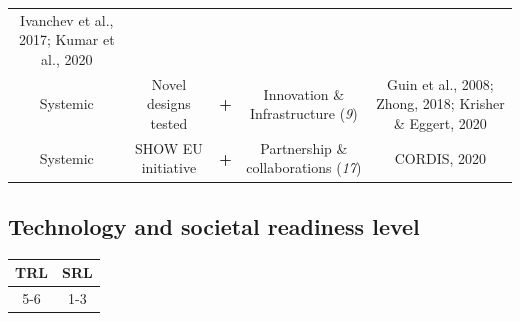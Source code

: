 \documentclass[
]{book}
\begin{document}
\begin{longtable}[]{@{}ccccc@{}}
\begin{minipage}[t]{0.17\columnwidth}
Ivanchev et al., 2017; Kumar et al., 2020\strut
\end{minipage}\tabularnewline
\begin{minipage}[t]{0.17\columnwidth}\centering
Systemic\strut
\end{minipage} & \begin{minipage}[t]{0.16\columnwidth}\centering
Novel designs tested\strut
\end{minipage} & \begin{minipage}[t]{0.17\columnwidth}\centering
\textbf{+}\strut
\end{minipage} & \begin{minipage}[t]{0.17\columnwidth}\centering
Innovation \& Infrastructure (\emph{9})\strut
\end{minipage} & \begin{minipage}[t]{0.17\columnwidth}\centering
Guin et al., 2008; Zhong, 2018; Krisher \& Eggert, 2020\strut
\end{minipage}\tabularnewline
\begin{minipage}[t]{0.17\columnwidth}\centering
Systemic\strut
\end{minipage} & \begin{minipage}[t]{0.16\columnwidth}\centering
SHOW EU initiative\strut
\end{minipage} & \begin{minipage}[t]{0.17\columnwidth}\centering
\textbf{+}\strut
\end{minipage} & \begin{minipage}[t]{0.17\columnwidth}\centering
Partnership \& collaborations (\emph{17})\strut
\end{minipage} & \begin{minipage}[t]{0.17\columnwidth}\centering
CORDIS, 2020\strut
\end{minipage}\tabularnewline
\bottomrule
\end{longtable}

\hypertarget{technology-and-societal-readiness-level}{%
\subsection*{Technology and societal readiness level}\label{technology-and-societal-readiness-level}}

\begin{longtable}[]{@{}cc@{}}
\toprule
TRL & SRL\tabularnewline
\midrule
\endhead
5-6 & 1-3\tabularnewline
\bottomrule
\end{longtable}
\end{document}
